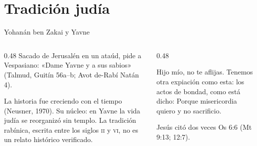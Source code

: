 \section{Tradición judía}
\begin{frame}{Yohanán ben Zakai y Yavne}
\begin{columns}[T,onlytextwidth]
\begin{column}{0.48\textwidth}\footnotesize
Sacado de Jerusalén en un ataúd, pide a Vespasiano: «Dame Yavne y a sus sabios» (Talmud, Guitín 56a--b; Avot de-Rabí Natán 4).\par
\begin{notalam}
La historia fue creciendo con el tiempo (Neusner, 1970). Su núcleo: en Yavne la vida judía se reorganizó sin templo. La tradición rabínica, escrita entre los siglos \textsc{ii} y \textsc{vi}, no es un relato histórico verificado.
\end{notalam}
\end{column}
\begin{column}{0.48\textwidth}
\begin{cita}Hijo mío, no te aflijas. Tenemos otra expiación como esta: los actos de bondad, como está dicho: Porque misericordia quiero y no sacrificio.\end{cita}
\footnotesize Jesús citó dos veces Os 6:6 (Mt 9:13; 12:7).
\end{column}
\end{columns}
\vspace{4pt}
\centering
{}
\elabpropia
\end{frame}

